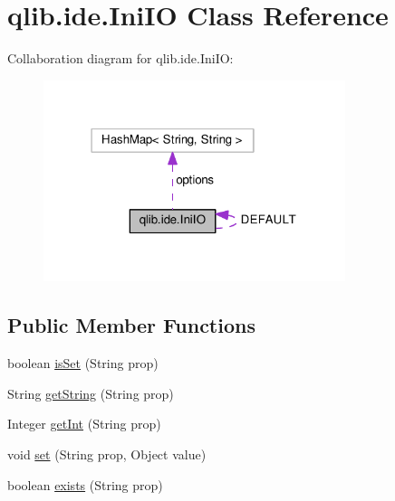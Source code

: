 \hypertarget{classqlib_1_1ide_1_1IniIO}{}\section{qlib.\+ide.\+Ini\+IO Class Reference}
\label{classqlib_1_1ide_1_1IniIO}


Collaboration diagram for qlib.\+ide.\+Ini\+IO\+:\nopagebreak
\begin{figure}[H]
\begin{center}
\leavevmode
\includegraphics[width=250pt]{classqlib_1_1ide_1_1IniIO__coll__graph}
\end{center}
\end{figure}
\subsection*{Public Member Functions}
\begin{DoxyCompactItemize}
\item 
boolean \hyperlink{classqlib_1_1ide_1_1IniIO_a69a0c6a7e4bf6d161e37db728bff03a6}{is\+Set} (String prop)
\item 
String \hyperlink{classqlib_1_1ide_1_1IniIO_aab6608976c5f371d0f044fc7d39f0328}{get\+String} (String prop)
\item 
Integer \hyperlink{classqlib_1_1ide_1_1IniIO_a01a6fe06552fefab11669ea65ace7392}{get\+Int} (String prop)
\item 
void \hyperlink{classqlib_1_1ide_1_1IniIO_a2337d52ad4d343c74b808f64e70710f0}{set} (String prop, Object value)
\item 
boolean \hyperlink{classqlib_1_1ide_1_1IniIO_a68567b380e0074a223137077125eb060}{exists} (String prop)
\end{DoxyCompactItemize}
